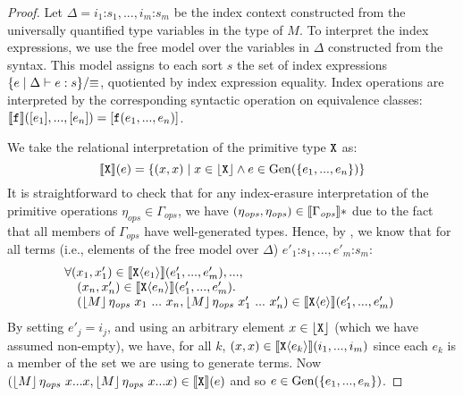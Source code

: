 \begin{proof}
  Let $\Delta = i_1\mathord:s_1,...,i_m\mathord:s_m$ be the index
  context constructed from the universally quantified type variables
  in the type of $M$.  To interpret the index expressions, we use the
  free model over the variables in $\Delta$ constructed from the
  syntax. This model assigns to each sort $s$ the set of index
  expressions $\{ e \mathrel| \Delta \vdash e : s \}/\mathord\equiv$,
  quotiented by index expression equality. Index operations are
  interpreted by the corresponding syntactic operation on equivalence
  classes: $\llbracket \texttt{\textup{f}} \rrbracket([e_1],...,[e_n]) =
  [\texttt{\textup{f}}(e_1,...,e_n)]$.

  We take the relational interpretation of the primitive type
  $\textup{\texttt{X}}$ as:
  \begin{displaymath}
    \llbracket \textup{\texttt{X}} \rrbracket(e) = \{ (x,x) \mathrel| x \in \left\lfloor \textup{\texttt{X}} \right\rfloor \land e \in \mathrm{Gen}(\{e_1,...,e_n\}) \}
  \end{displaymath}
  It is straightforward to check that for any index-erasure
  interpretation of the primitive operations $\eta_{\mathit{ops}} \in
  \Gamma_{\mathit{ops}}$, we have $(\eta_{\mathit{ops}},
  \eta_{\mathit{ops}}) \in \llbracket \Gamma_{\mathit{ops}} \rrbracket*$ due to the
  fact that all members of $\Gamma_{\mathit{ops}}$ have well-generated
  types. Hence, by , we know that for all
  terms (i.e., elements of the free model over $\Delta$)
  $e'_1\mathord:s_1,...,e'_m\mathord:s_m$:
  \begin{displaymath}%
    \begin{array}{@{}l}
      \forall (x_1,x_1') \in \rsem{\tyPrim{X}{e_1}}(e'_1,...,e'_m), ..., \\
      \quad(x_n, x'_n) \in \rsem{\tyPrim{X}{e_n}}(e'_1,...,e'_m). \\
      \quad (\tmSem{M} \eta_{\mathit{ops}}~x_1 ~...~x_n, \tmSem{M}\eta_{\mathit{ops}}~x'_1~...~x'_n) \in \rsem{\tyPrim{X}{e}}(e'_1,...,e'_m)
    \end{array}
  \end{displaymath}
  By setting $e'_j = i_j$, and using an arbitrary element $x \in
  \left\lfloor \textup{\texttt{X}} \right\rfloor$ (which we have assumed non-empty), we have,
  for all $k$, $(x,x) \in \llbracket \textup{\texttt{X}}\langle e_k \rangle \rrbracket(i_1,...,i_m)$ since
  each $e_k$ is a member of the set we are using to generate
  terms. Now $(\left\lfloor{M}\right\rfloor \eta_{\mathit{ops}}~x...x,
  \left\lfloor{M}\right\rfloor\eta_{\mathit{ops}}~x...x) \in \llbracket \textup{\texttt{X}} \rrbracket(e)$ and
  so $e \in \mathrm{Gen}(\{e_1,...,e_n\})$.
\end{proof}

